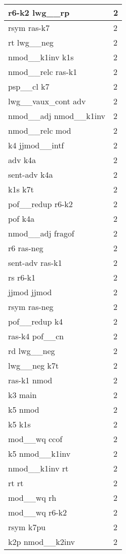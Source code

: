 \documentclass[a4 paper]{article}
\begin{document}
\begin{longtable}{p{}p{}}
r6-k2 lwg\_\_rp  & 2 \\ \midrule
rsym ras-k7  & 2 \\ \midrule
rt lwg\_\_neg  & 2 \\ \midrule
nmod\_\_k1inv k1s  & 2 \\ \midrule
nmod\_\_relc ras-k1  & 2 \\ \midrule
psp\_\_cl k7  & 2 \\ \midrule
lwg\_\_vaux\_cont adv  & 2 \\ \midrule
nmod\_\_adj nmod\_\_k1inv  & 2 \\ \midrule
nmod\_\_relc mod  & 2 \\ \midrule
k4 jjmod\_\_intf  & 2 \\ \midrule
adv k4a  & 2 \\ \midrule
sent-adv k4a  & 2 \\ \midrule
k1s k7t  & 2 \\ \midrule
pof\_\_redup r6-k2  & 2 \\ \midrule
pof k4a  & 2 \\ \midrule
nmod\_\_adj fragof  & 2 \\ \midrule
r6 ras-neg  & 2 \\ \midrule
sent-adv ras-k1  & 2 \\ \midrule
rs r6-k1  & 2 \\ \midrule
jjmod jjmod  & 2 \\ \midrule
rsym ras-neg  & 2 \\ \midrule
pof\_\_redup k4  & 2 \\ \midrule
ras-k4 pof\_\_cn  & 2 \\ \midrule
rd lwg\_\_neg  & 2 \\ \midrule
lwg\_\_neg k7t  & 2 \\ \midrule
ras-k1 nmod  & 2 \\ \midrule
k3 main  & 2 \\ \midrule
k5 nmod  & 2 \\ \midrule
k5 k1s  & 2 \\ \midrule
mod\_\_wq ccof  & 2 \\ \midrule
k5 nmod\_\_k1inv  & 2 \\ \midrule
nmod\_\_k1inv rt  & 2 \\ \midrule
rt rt  & 2 \\ \midrule
mod\_\_wq rh  & 2 \\ \midrule
mod\_\_wq r6-k2  & 2 \\ \midrule
rsym k7pu  & 2 \\ \midrule
k2p nmod\_\_k2inv  & 2 \\ \midrule

\end{longtable}
\end{document}
